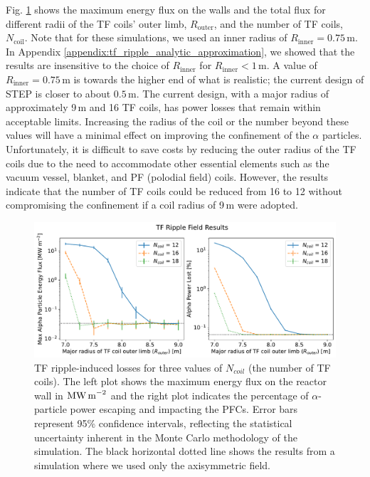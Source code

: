 \documentclass[10pt, a4paper, twoside]{article}
\begin{document}
Fig. \ref{fig:max_and_total_flux_vs_rcoil_and_ncoil} shows the maximum energy flux on the walls and the total flux for different radii of the TF coils' outer limb, $R_\text{outer}$, and the number of TF coils, $N_\text{coil}$. 
Note that for these simulations, we used an inner radius of $R_\text{inner}=0.75\,\text{m}$. In Appendix \ref{appendix:tf_ripple_analytic_approximation}, we showed that the results are insensitive to the choice of $R_\text{inner}$ for $R_\text{inner}<1\,\text{m}$. A value of $R_\text{inner}=0.75\,\text{m}$ is towards the higher end of what is realistic; the current design of STEP is closer to about $0.5\,\text{m}$. 
The current design, with a major radius of approximately 9\,m and 16 TF coils, has power losses that remain within acceptable limits. Increasing the radius of the coil or the number beyond these values will have a minimal effect on improving the confinement of the $\alpha$ particles. 
Unfortunately, it is difficult to save costs by reducing the outer radius of the TF coils due to the need to accommodate other essential elements such as the vacuum vessel, blanket, and PF (polodial field) coils. However, the results indicate that the number of TF coils could be reduced from 16 to 12 without compromising the confinement if a coil radius of 9\,m were adopted.

\begin{figure}[htpb]
    \centering
    \vspace{1cm}
    \includegraphics[width=0.99\linewidth]{Figures/max_and_total_flux_vs_rcoil.pdf}
    \caption{TF ripple-induced losses for three values of $N_{coil}$ (the number of TF coils). The left plot shows the maximum energy flux on the reactor wall in $\text{MW\,m}^{-2}$ and the right plot indicates the percentage of $\alpha$-particle power escaping and impacting the PFCs. Error bars represent 95\% confidence intervals, reflecting the statistical uncertainty inherent in the Monte Carlo methodology of the simulation. The black horizontal dotted line shows the results from a simulation where we used only the axisymmetric field.}
    \label{fig:max_and_total_flux_vs_rcoil_and_ncoil}
\end{figure}
\end{document}
